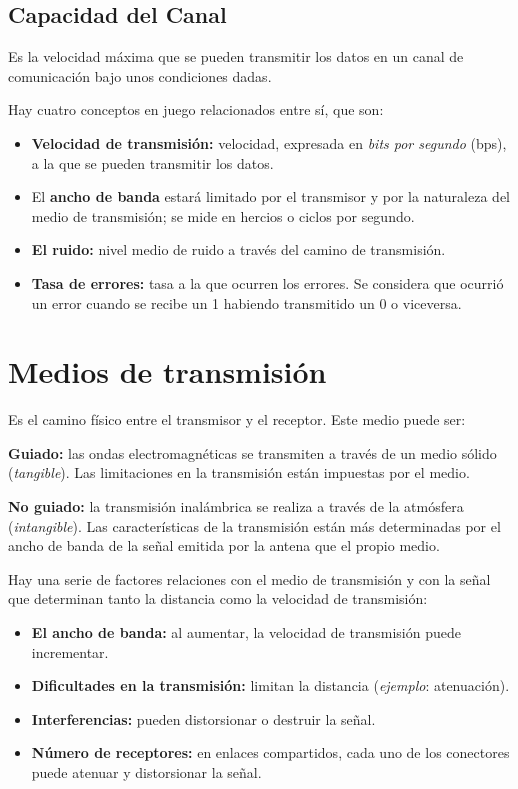 \documentclass[10pt,a4paper]{article}
\begin{document}
\subsection{Capacidad del Canal}
Es la velocidad máxima que se pueden transmitir los datos en un canal de comunicación bajo unos condiciones dadas.

Hay cuatro conceptos en juego relacionados entre sí, que son:
\begin{itemize}
\item \textbf{Velocidad de transmisión:} velocidad, expresada en \textit{bits por segundo} (bps), a la que se pueden transmitir los datos.
\item El \textbf{ancho de banda} estará limitado por el transmisor y por la naturaleza del medio de transmisión; se mide en hercios o ciclos por segundo.
\item \textbf{El ruido:} nivel medio de ruido a través del camino de transmisión.
\item \textbf{Tasa de errores:} tasa a la que ocurren los errores. Se considera que ocurrió un error cuando se recibe un 1 habiendo transmitido un 0 o viceversa.
\end{itemize}

\section{Medios de transmisión}

Es el camino físico entre el transmisor y el receptor. Este medio puede ser:
\begin{description}
\item \textbf{Guiado:} las ondas electromagnéticas se transmiten a través de un medio sólido (\textit{tangible}). Las limitaciones en la transmisión están impuestas por el medio.
\item \textbf{No guiado:} la transmisión inalámbrica se realiza a través de la atmósfera (\textit{intangible}). Las características de la transmisión están más determinadas por el ancho de banda de la señal emitida por la antena que el propio medio.
\end{description}

Hay una serie de factores relaciones con el medio de transmisión y con la señal que determinan tanto la distancia como la velocidad de transmisión:
\begin{itemize}
\item \textbf{El ancho de banda:} al aumentar, la velocidad de transmisión puede incrementar.
\item \textbf{Dificultades en la transmisión:} limitan la distancia (\textit{ejemplo}: atenuación).
\item \textbf{Interferencias:} pueden distorsionar o destruir la señal.
\item \textbf{Número de receptores:} en enlaces compartidos, cada uno de los conectores puede atenuar y distorsionar la señal.
\end{itemize}
\end{document}
